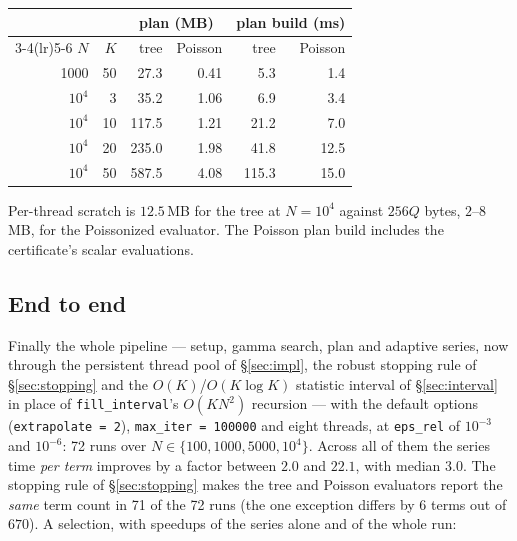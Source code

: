 \documentclass[11pt]{article}
\begin{document}
\begin{center}
\small
\begin{tabular}{rrrrrr}
\toprule
 & & \multicolumn{2}{c}{plan (MB)} & \multicolumn{2}{c}{plan build (ms)} \\
\cmidrule(lr){3-4}\cmidrule(lr){5-6}
$N$ & $K$ & tree & Poisson & tree & Poisson \\
\midrule
1000   & 50 & 27.3  & 0.41 & 5.3   & 1.4  \\
$10^4$ & 3  & 35.2  & 1.06 & 6.9   & 3.4  \\
$10^4$ & 10 & 117.5 & 1.21 & 21.2  & 7.0  \\
$10^4$ & 20 & 235.0 & 1.98 & 41.8  & 12.5 \\
$10^4$ & 50 & 587.5 & 4.08 & 115.3 & 15.0 \\
\bottomrule
\end{tabular}
\end{center}
Per-thread scratch is $12.5$\,MB for the tree at $N=10^4$ against $256Q$ bytes, $2$--$8$\,MB, for the
Poissonized evaluator. The Poisson plan build includes the certificate's scalar evaluations.

\subsection{End to end}

Finally the whole pipeline --- setup, gamma search, plan and adaptive series, now through the
persistent thread pool of \S\ref{sec:impl}, the robust stopping rule of \S\ref{sec:stopping} and the
$O(K)$/$O(K\log K)$ statistic interval of \S\ref{sec:interval} in place of \texttt{fill\_interval}'s
$O(KN^2)$ recursion --- with the default options (\texttt{extrapolate = 2}), \texttt{max\_iter =
100000} and eight threads, at \texttt{eps\_rel} of $10^{-3}$ and $10^{-6}$: 72 runs over
$N\in\{100,1000,5000,10^4\}$. Across all of them the series time \emph{per term} improves by a
factor between $2.0$ and $22.1$, with median $3.0$. The stopping rule of \S\ref{sec:stopping} makes
the tree and Poisson evaluators report the \emph{same} term count in 71 of the 72 runs (the one
exception differs by $6$ terms out of $670$). A selection, with speedups of the series alone and of
the whole run:
\end{document}
